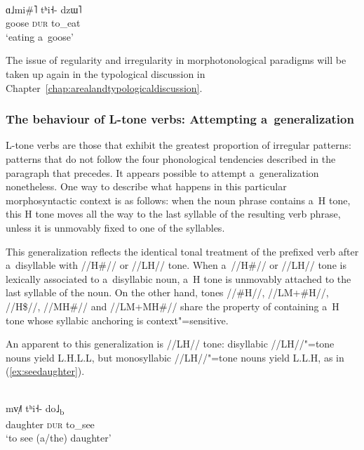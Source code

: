 \begin{exe}
	\ex
	\label{ex:eatgoose}
	\\
	\gll ɑ˩mi\#˥			tʰi˧-			dzɯ˥\\
	goose	\textsc{dur}		to\_eat\\
	\glt ‘eating a~goose’
\end{exe}

The issue of regularity and irregularity in morphotonological paradigms will be taken up again in the typological discussion in Chapter~\ref{chap:arealandtypologicaldiscussion}. 


\subsubsection{The behaviour of L-tone verbs: Attempting a~generalization}
\label{sec:thebehaviourofltoneverbsattemptingageneralization}

L-tone verbs are those that exhibit the greatest proportion of irregular patterns: patterns that do
not follow the four phonological tendencies described in the paragraph that precedes. It appears possible to attempt a~generalization
nonetheless. One way to describe what happens in this particular morphosyntactic context is as follows: when the noun phrase contains a~H tone, this H tone moves all the way to the last syllable of the resulting verb phrase, unless it is unmovably fixed to one of the syllables.

This generalization reflects the identical tonal treatment of the prefixed verb after a~disyllable
with \mbox{//H\#//} or \mbox{//LH//} tone. When a~\mbox{//H\#//} or \mbox{//LH//} tone is lexically associated to a~disyllabic noun, a~H tone is unmovably attached to the last syllable of the noun. On the other hand, tones \mbox{//\#H//}, //LM+\#H//, \mbox{//H\$//}, \mbox{//MH\#//}
and //LM+MH\#// share the property of containing a~H tone whose syllabic anchoring is context"=sensitive.

An apparent  to this generalization is \mbox{//LH//} tone: disyllabic \mbox{//LH//}"=tone nouns yield
L.H.L.L, but {monosyllabic} \mbox{//LH//}"=tone nouns yield L.L.H, as in (\ref{ex:seedaughter}).

\begin{exe}
	\ex
	\label{ex:seedaughter}
	\\
	\gll mv̩˩˥		tʰi˧-			do˩\textsubscript{b}\\
	daughter		\textsc{dur}		to\_see\\
	\glt ‘to see \mbox{(a/the)}
	daughter’
\end{exe}

